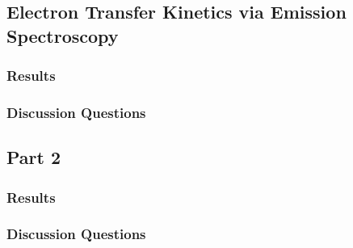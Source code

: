 


\subsection{Electron Transfer Kinetics via Emission Spectroscopy}
\subsubsection*{Results}

\subsubsection*{Discussion Questions}

\subsection{Part 2}
\subsubsection*{Results}

\subsubsection*{Discussion Questions}







